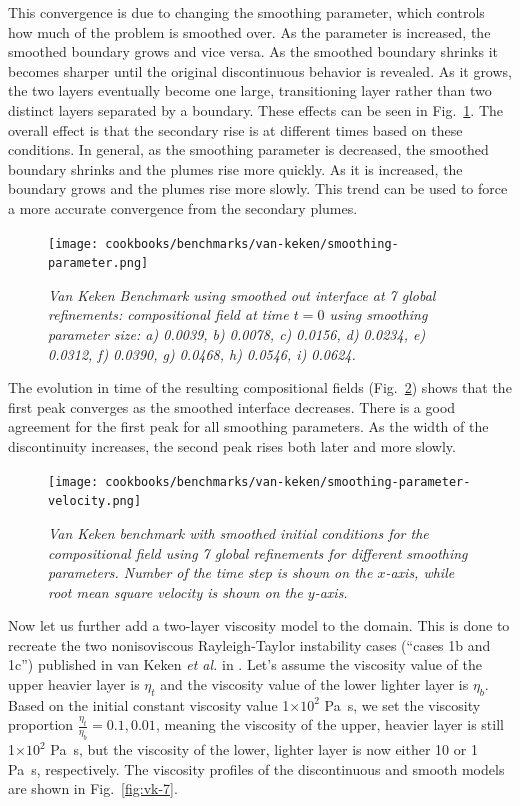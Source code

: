 \documentclass{article}
\begin{document}
This convergence is due to changing the smoothing parameter, which controls how much of the problem is smoothed over.  As the parameter is increased, the smoothed boundary grows and vice versa.  As the smoothed boundary shrinks it becomes sharper until the original discontinuous behavior is revealed.  As it grows, the two layers eventually become one large, transitioning layer rather than two distinct layers separated by a boundary.  These effects can be seen in Fig.~\ref{fig:vk-5}.  The overall effect is that the secondary rise is at different times based on these conditions.  In general, as the smoothing parameter is decreased, the smoothed boundary shrinks and the plumes rise more quickly.  As it is increased, the boundary grows and the plumes rise more slowly.  This trend can be used to force a more accurate convergence from the secondary plumes.

\begin{figure}
        \centering
        \texttt{[image: cookbooks/benchmarks/van-keken/smoothing-parameter.png]}
        \caption{\it Van Keken Benchmark using smoothed out interface at 7 global refinements: compositional field at time $t=0$ using smoothing parameter size: a) 0.0039, b) 0.0078, c) 0.0156, d) 0.0234, e) 0.0312, f) 0.0390, g) 0.0468, h) 0.0546, i) 0.0624.}
        \label{fig:vk-5}
\end{figure}

The evolution in time of the resulting compositional fields (Fig.~\ref{fig:vk-6}) shows that the first peak converges as the smoothed interface decreases. There is a good agreement for the first peak for all smoothing parameters.  As the width of the discontinuity increases, the second peak rises both later and more slowly.

\begin{figure}
        \centering
        \texttt{[image: cookbooks/benchmarks/van-keken/smoothing-parameter-velocity.png]}
        \caption{\it Van Keken benchmark with smoothed initial conditions for the compositional field using 7 global refinements for different smoothing parameters.  Number of the time step is shown on the $x$-axis, while root mean square velocity is shown on the $y$-axis.}
        \label{fig:vk-6}
\end{figure}

Now let us further add a two-layer viscosity model to the domain. This is done to recreate the two nonisoviscous Rayleigh-Taylor instability cases (``cases 1b and 1c'') published in van Keken \textit{et al.} in \cite{KKSCND97}.  Let's assume the viscosity value of the upper heavier layer is $\eta_{t}$ and the viscosity value of the lower lighter layer is $\eta_{b}$. Based on the initial constant viscosity value 1$\times10^{2}$ Pa~s, we set the viscosity proportion $\frac{\eta_{t}}{\eta_{b}}=0.1, 0.01$, meaning the viscosity of the upper, heavier layer is still 1$\times10^{2}$ Pa~s, but the viscosity of the lower, lighter layer is now either 10 or 1 Pa~s, respectively. The viscosity profiles of the discontinuous and smooth models are shown in Fig.~\ref{fig:vk-7}.
\end{document}
